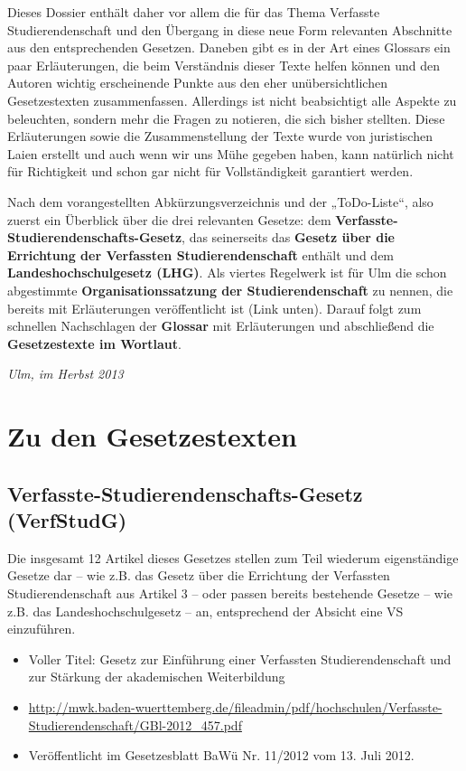 \documentclass[
10pt,
a4paper,
twoside,								%
titlepage=false,							%
draft=false								%
]{scrartcl}
\begin{document}
Dieses Dossier enthält daher vor allem die für das Thema Verfasste Studierendenschaft und den Übergang in diese neue Form relevanten Abschnitte aus den entsprechenden Gesetzen. Daneben gibt es in der Art eines Glossars ein paar Erläuterungen, die beim Verständnis dieser Texte helfen können und den Autoren wichtig erscheinende Punkte aus den eher unübersichtlichen Gesetzestexten zusammenfassen. Allerdings ist nicht beabsichtigt alle Aspekte zu beleuchten, sondern mehr die Fragen zu notieren, die sich bisher stellten. Diese Erläuterungen sowie die Zusammenstellung der Texte wurde von juristischen Laien erstellt und auch wenn wir uns Mühe gegeben haben, kann natürlich nicht für Richtigkeit und schon gar nicht für Vollständigkeit garantiert werden.

Nach dem vorangestellten Abkürzungsverzeichnis und der „ToDo-Liste“, also zuerst ein Überblick über die drei relevanten Gesetze: dem \textbf{Verfasste-Studierendenschafts-Gesetz}, das seinerseits das \textbf{Gesetz über die Errichtung der Verfassten Studierendenschaft} enthält und dem \textbf{Landeshochschulgesetz (LHG)}. Als viertes Regelwerk ist für Ulm die schon abgestimmte \textbf{Organisationssatzung der Studierendenschaft} zu nennen, die bereits mit Erläuterungen veröffentlicht ist (Link unten). Darauf folgt zum schnellen Nachschlagen der \textbf{Glossar} mit Erläuterungen und abschließend die \textbf{Gesetzestexte im Wortlaut}.

\begin{flushright}
	\textit{Ulm, im Herbst 2013}
\end{flushright}



\newpage
\section{Zu den Gesetzestexten}
\subsection{Verfasste-Studierendenschafts-Gesetz (VerfStudG)}

Die insgesamt 12 Artikel dieses Gesetzes stellen zum Teil wiederum eigenständige Gesetze dar – wie z.B. das Gesetz über die Errichtung der Verfassten Studierendenschaft aus Artikel 3 – oder passen bereits bestehende Gesetze – wie z.B. das Landeshochschulgesetz – an, entsprechend der Absicht eine VS einzuführen.

\begin{itemize}
	\item Voller Titel: Gesetz zur Einführung einer Verfassten Studierendenschaft und zur Stärkung der akademischen Weiterbildung
	\item \sloppy \url{http://mwk.baden-wuerttemberg.de/fileadmin/pdf/hochschulen/Verfasste-Studierendenschaft/GBl-2012_457.pdf}
	\item Veröffentlicht im Gesetzesblatt BaWü Nr. 11/2012 vom 13. Juli 2012.
\end{itemize}
\end{document}
